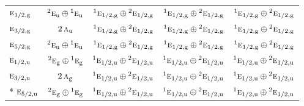 \documentclass[10pt,a4paper]{article}
\numberwithin{equation}{section}
\newcommand{\irr}[1]{\text{\normalfont\scshape #1}}
\newcommand{\conjpair}[1]{{}^{#1}}
\newcommand{\ptag}[1]{\mathrm{#1}}
\begin{document}
{\begin{longtable}{@{}lcccc@{}}
$\irr{e}_{1/2,\ptag{g}}$ & $\conjpair{2}\irr{e}_{\ptag{u}}\oplus \conjpair{1}\irr{e}_{\ptag{u}}$ & $\conjpair{1}\irr{e}_{1/2,\ptag{g}}\oplus \conjpair{2}\irr{e}_{1/2,\ptag{g}}$ & $\conjpair{1}\irr{e}_{1/2,\ptag{g}}\oplus \conjpair{2}\irr{e}_{1/2,\ptag{g}}$ & $\conjpair{1}\irr{e}_{1/2,\ptag{g}}\oplus \conjpair{2}\irr{e}_{1/2,\ptag{g}}$\\
$\irr{e}_{3/2,\ptag{g}}$ & $2\,\irr{a}_{\ptag{u}}$ & $\conjpair{1}\irr{e}_{1/2,\ptag{g}}\oplus \conjpair{2}\irr{e}_{1/2,\ptag{g}}$ & $\conjpair{1}\irr{e}_{1/2,\ptag{g}}\oplus \conjpair{2}\irr{e}_{1/2,\ptag{g}}$ & $\conjpair{1}\irr{e}_{1/2,\ptag{g}}\oplus \conjpair{2}\irr{e}_{1/2,\ptag{g}}$\\
$\irr{e}_{5/2,\ptag{g}}$ & $\conjpair{2}\irr{e}_{\ptag{u}}\oplus \conjpair{1}\irr{e}_{\ptag{u}}$ & $\conjpair{1}\irr{e}_{1/2,\ptag{g}}\oplus \conjpair{2}\irr{e}_{1/2,\ptag{g}}$ & $\conjpair{1}\irr{e}_{1/2,\ptag{g}}\oplus \conjpair{2}\irr{e}_{1/2,\ptag{g}}$ & $\conjpair{1}\irr{e}_{1/2,\ptag{g}}\oplus \conjpair{2}\irr{e}_{1/2,\ptag{g}}$\\
$\irr{e}_{1/2,\ptag{u}}$ & $\conjpair{2}\irr{e}_{\ptag{g}}\oplus \conjpair{1}\irr{e}_{\ptag{g}}$ & $\conjpair{1}\irr{e}_{1/2,\ptag{u}}\oplus \conjpair{2}\irr{e}_{1/2,\ptag{u}}$ & $\conjpair{1}\irr{e}_{1/2,\ptag{u}}\oplus \conjpair{2}\irr{e}_{1/2,\ptag{u}}$ & $\conjpair{1}\irr{e}_{1/2,\ptag{u}}\oplus \conjpair{2}\irr{e}_{1/2,\ptag{u}}$\\
$\irr{e}_{3/2,\ptag{u}}$ & $2\,\irr{a}_{\ptag{g}}$ & $\conjpair{1}\irr{e}_{1/2,\ptag{u}}\oplus \conjpair{2}\irr{e}_{1/2,\ptag{u}}$ & $\conjpair{1}\irr{e}_{1/2,\ptag{u}}\oplus \conjpair{2}\irr{e}_{1/2,\ptag{u}}$ & $\conjpair{1}\irr{e}_{1/2,\ptag{u}}\oplus \conjpair{2}\irr{e}_{1/2,\ptag{u}}$\\*
$\irr{e}_{5/2,\ptag{u}}$ & $\conjpair{2}\irr{e}_{\ptag{g}}\oplus \conjpair{1}\irr{e}_{\ptag{g}}$ & $\conjpair{1}\irr{e}_{1/2,\ptag{u}}\oplus \conjpair{2}\irr{e}_{1/2,\ptag{u}}$ & $\conjpair{1}\irr{e}_{1/2,\ptag{u}}\oplus \conjpair{2}\irr{e}_{1/2,\ptag{u}}$ & $\conjpair{1}\irr{e}_{1/2,\ptag{u}}\oplus \conjpair{2}\irr{e}_{1/2,\ptag{u}}$\\
\bottomrule\end{longtable}}
\end{document}
